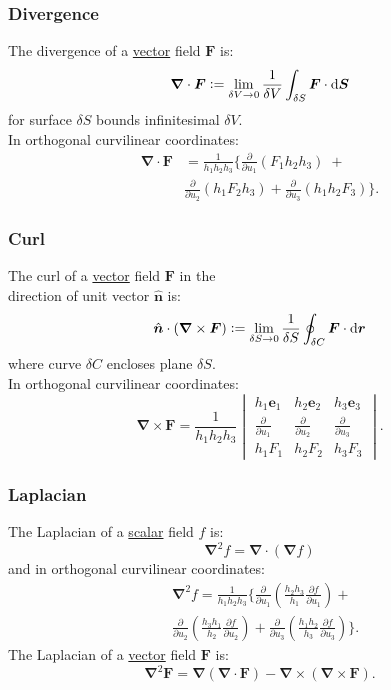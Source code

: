 \documentclass{article}
\newcommand{\deq}{\vcentcolon=}
\newcommand{\vc}[1]{\boldsymbol{#1}}
\begin{document}
\begin{multicols*}{3}
\subsubsection*{Divergence}
The divergence of a \underline{vector} field $\vc{F}$ is:
$$\vc{\nabla}\cdot\vc{F}\deq\lim_{\delta V\rightarrow0}
\frac{1}{\delta V}\int_{\delta S}
\vc{F}\cdot\dd\vc{S}$$
for surface $\delta S$ bounds infinitesimal $\delta V$. \\
In orthogonal curvilinear coordinates:
\begin{align*}
    \vc{\nabla}\cdot\vc{F}
    &=\frac{1}{h_1 h_2 h_3}\biggl\{
    \frac{\partial}{\partial u_1}(F_1 h_2 h_3)\;+ \\
    &\frac{\partial}{\partial u_2}(h_1 F_2 h_3)
    +\frac{\partial}{\partial u_3}(h_1 h_2 F_3)
    \biggr\}.
\end{align*}

\subsubsection*{Curl}
The curl of a \underline{vector} field $\vc{F}$
in the \\ direction of unit vector $\hat{\vc{n}}$ is:
$$\hat{\vc{n}}\cdot(\vc{\nabla}\times\vc{F})
\deq\lim_{\delta S\rightarrow0}\frac{1}{\delta S}
\oint_{\delta C}\vc{F}\cdot\dd\vc{r}$$
where curve $\delta C$ encloses plane $\delta S$. \\
In orthogonal curvilinear coordinates:
$$\vc{\nabla}\times\vc{F}
=\frac{1}{h_1 h_2 h_3}
\begin{vmatrix}
    h_1\vc{e}_1 & h_2\vc{e}_2 & h_3\vc{e}_3 \\
    \frac{\partial}{\partial u_1} &
    \frac{\partial}{\partial u_2} &
    \frac{\partial}{\partial u_3} \\
    h_1 F_1 & h_2 F_2 & h_3 F_3
\end{vmatrix}.$$

\subsubsection*{Laplacian}
The Laplacian of a \underline{scalar} field $f$ is:
$$\vc{\nabla}^2 f=\vc{\nabla}\cdot(\vc{\nabla}f)$$
and in orthogonal curvilinear coordinates:
\begin{align*}
    &\vc{\nabla}^2 f
    =\frac{1}{h_1 h_2 h_3}\biggl\{
    \frac{\partial}{\partial u_1}
    \left(\frac{h_2 h_3}{h_1}\frac{\partial f}{\partial u_1}\right)
    + \\
    &\frac{\partial}{\partial u_2}
    \left(\frac{h_3 h_1}{h_2}\frac{\partial f}{\partial u_2}\right)
    +\frac{\partial}{\partial u_3}
    \left(\frac{h_1 h_2}{h_3}\frac{\partial f}{\partial u_3}\right)
    \biggr\}.
\end{align*}
The Laplacian of a \underline{vector} field $\vc{F}$ is:
$$\vc{\nabla}^2\vc{F}=\vc{\nabla}(\vc{\nabla}\cdot\vc{F})
-\vc{\nabla}\times(\vc{\nabla}\times\vc{F}).$$


\end{multicols*}
\end{document}
